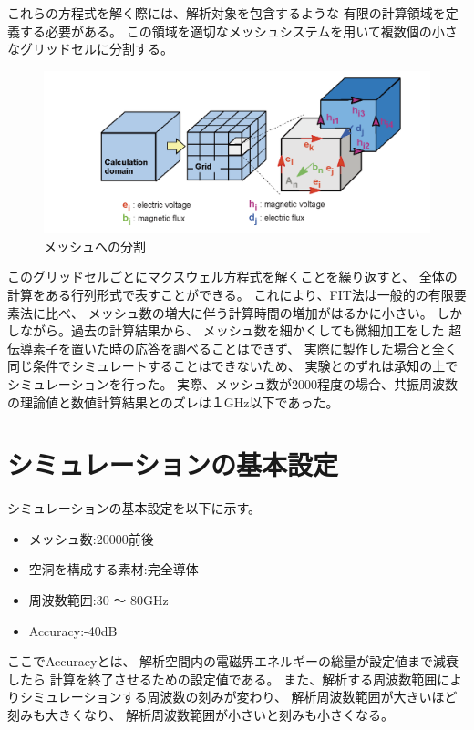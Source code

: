 これらの方程式を解く際には、解析対象を包含するような
有限の計算領域を定義する必要がある。
この領域を適切なメッシュシステムを用いて複数個の小さなグリッドセルに分割する。

\vspace{10 mm}

\begin{figure}[h]
  \begin{center}
    \includegraphics[width=12cm]{./image/mesh.png}
    \caption{メッシュへの分割\cite{MWS-2}}
    \label{fig:Mesh}
  \end{center}
\end{figure}

このグリッドセルごとにマクスウェル方程式を解くことを繰り返すと、
全体の計算をある行列形式で表すことができる。
これにより、FIT法は一般的の有限要素法に比べ、
メッシュ数の増大に伴う計算時間の増加がはるかに小さい。
しかしながら。過去の計算結果から、
メッシュ数を細かくしても微細加工をした
超伝導素子を置いた時の応答を調べることはできず、
実際に製作した場合と全く同じ条件でシミュレートすることはできないため、
実験とのずれは承知の上でシミュレーションを行った。
実際、メッシュ数が2000程度の場合、共振周波数の理論値と数値計算結果とのズレは１GHz以下であった。

\section{シミュレーションの基本設定}
シミュレーションの基本設定を以下に示す。

\begin{itemize}
  \item メッシュ数:20000前後
  \item 空洞を構成する素材:完全導体
  \item 周波数範囲:30 〜 80GHz
  \item Accuracy:-40dB
\end{itemize}

ここでAccuracyとは、
解析空間内の電磁界エネルギーの総量が設定値まで減衰したら
計算を終了させるための設定値である。
また、解析する周波数範囲によりシミュレーションする周波数の刻みが変わり、
解析周波数範囲が大きいほど刻みも大きくなり、
解析周波数範囲が小さいと刻みも小さくなる。
